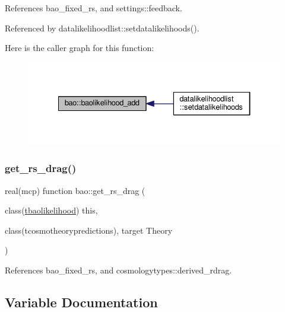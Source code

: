 References bao\+\_\+fixed\+\_\+rs, and settings\+::feedback.



Referenced by datalikelihoodlist\+::setdatalikelihoods().

Here is the caller graph for this function\+:
\nopagebreak
\begin{figure}[H]
\begin{center}
\leavevmode
\includegraphics[width=334pt]{namespacebao_a1e83b8129197b47271286760d4c11866_icgraph}
\end{center}
\end{figure}
\mbox{\label{namespacebao_af2ea26ba323749ae85e04fe46904d115}} 
\subsubsection{\texorpdfstring{get\+\_\+rs\+\_\+drag()}{get\_rs\_drag()}}
{\footnotesize\ttfamily real(mcp) function bao\+::get\+\_\+rs\+\_\+drag (\begin{DoxyParamCaption}\item[{class(\mbox{\hyperlink{structbao_1_1tbaolikelihood}{tbaolikelihood}})}]{this,  }\item[{class(tcosmotheorypredictions), target}]{Theory }\end{DoxyParamCaption})\hspace{0.3cm}{\ttfamily [private]}}



References bao\+\_\+fixed\+\_\+rs, and cosmologytypes\+::derived\+\_\+rdrag.



\subsection{Variable Documentation}
\mbox{\label{namespacebao_ab53a2d435899a21c918a07f7243d2a9f}} 
